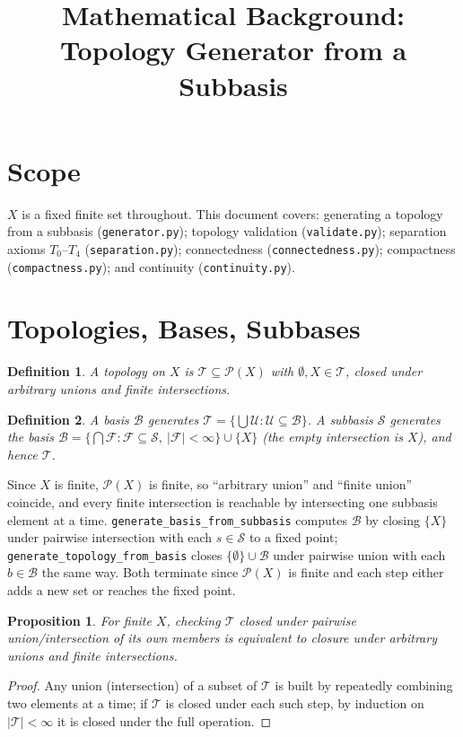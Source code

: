 \documentclass[11pt]{article}
\title{Mathematical Background: Topology Generator from a Subbasis}
\author{}
\date{}
\newtheorem{proposition}{Proposition}
\newtheorem{definition}{Definition}
\begin{document}
\maketitle

\section*{Scope}

$X$ is a fixed finite set throughout. This document covers: generating a topology from a
subbasis (\texttt{generator.py}); topology validation (\texttt{validate.py}); separation
axioms $T_0$--$T_4$ (\texttt{separation.py}); connectedness
(\texttt{connectedness.py}); compactness (\texttt{compactness.py}); and continuity
(\texttt{continuity.py}).

\section{Topologies, Bases, Subbases}

\begin{definition}
A \emph{topology} on $X$ is $\mathcal T \subseteq \mathcal P(X)$ with
$\emptyset, X \in \mathcal T$, closed under arbitrary unions and finite intersections.
\end{definition}

\begin{definition}
A \emph{basis} $\mathcal B$ generates $\mathcal T = \{\bigcup \mathcal U : \mathcal U
\subseteq \mathcal B\}$. A \emph{subbasis} $\mathcal S$ generates the basis
$\mathcal B = \{\bigcap \mathcal F : \mathcal F \subseteq \mathcal S,\ |\mathcal F| <
\infty\} \cup \{X\}$ (the empty intersection is $X$), and hence $\mathcal T$.
\end{definition}

Since $X$ is finite, $\mathcal P(X)$ is finite, so ``arbitrary union'' and ``finite union''
coincide, and every finite intersection is reachable by intersecting one subbasis element
at a time. \texttt{generate\_basis\_from\_subbasis} computes $\mathcal B$ by closing
$\{X\}$ under pairwise intersection with each $s \in \mathcal S$ to a fixed point;
\texttt{generate\_topology\_from\_basis} closes $\{\emptyset\}\cup\mathcal B$ under
pairwise union with each $b \in \mathcal B$ the same way. Both terminate since
$\mathcal P(X)$ is finite and each step either adds a new set or reaches the fixed point.

\begin{proposition}
For finite $X$, checking $\mathcal T$ closed under \emph{pairwise} union/intersection of
its own members is equivalent to closure under arbitrary unions and finite intersections.
\end{proposition}
\begin{proof}
Any union (intersection) of a subset of $\mathcal T$ is built by repeatedly combining two
elements at a time; if $\mathcal T$ is closed under each such step, by induction on
$|\mathcal T|<\infty$ it is closed under the full operation.
\end{proof}
\end{document}
